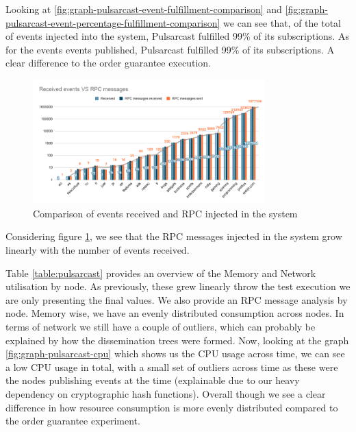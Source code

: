 Looking at \ref{fig:graph-pulsarcast-event-fulfillment-comparison} and
\ref{fig:graph-pulsarcast-event-percentage-fulfillment-comparison} we can
see that, of the total of events injected into the system, Pulsarcast fulfilled
99\% of
its subscriptions. As for the events events published, Pulsarcast fulfilled 99\%
of its subscriptions. A clear difference to the order guarantee execution.

\begin{figure}[!htb]
  \centering
  \includegraphics[width=0.8\textwidth]{img/graph-pulsarcast-rpc.png}
  \caption{Comparison of events received and RPC injected in the system}
  \label{fig:graph-pulsarcast-rpc}
\end{figure}

Considering figure \ref{fig:graph-pulsarcast-rpc}, we see that the RPC
messages injected in the system grow linearly with the number of events
received.

Table \ref{table:pulsarcast} provides an overview of the Memory and Network
utilisation by node. As previously, these grew linearly throw the test
execution we are only presenting the final values. We also provide an RPC
message analysis by node. Memory wise, we have an evenly distributed
consumption across nodes. In terms of network we still have a couple of
outliers, which can probably be explained by how the dissemination trees were
formed.  Now, looking at the graph \ref{fig:graph-pulsarcast-cpu} which shows
us the CPU usage across time, we can see a low CPU usage in total, with a small
set of outliers across time as these were the nodes publishing events at the
time (explainable due to our heavy dependency on cryptographic hash functions).
Overall though we see a clear difference in how resource consumption is more
evenly distributed compared to the order guarantee experiment.

